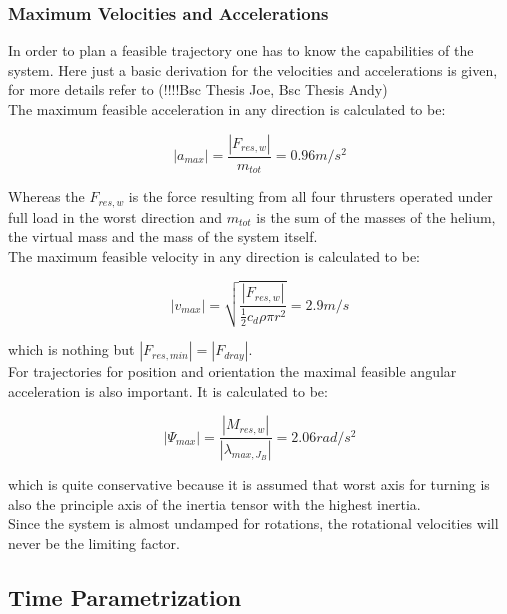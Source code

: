 \subsubsection{Maximum Velocities and Accelerations}
In order to plan a feasible trajectory one has to know the capabilities of the system. Here just a basic derivation for the velocities and accelerations is given, for more details refer to (!!!!Bsc Thesis Joe, Bsc Thesis Andy)\\

The maximum feasible acceleration in any direction is calculated to be:

\begin{equation}
  \left|a_{max} \right| =  \frac{\left|F_{res, w}\right|}{m_{tot}} = 0.96 m/s^2
\end{equation}

Whereas the $F_{res,w}$ is the force resulting from all four thrusters operated under full load in the worst direction and $m_{tot}$ is the sum of the masses of the helium, the virtual mass and the mass of the system itself.\\


The maximum feasible velocity in any direction is calculated to be:

\begin{equation}
\left|v_{max} \right| = \sqrt{\frac{\left|F_{res,w} \right|}{\frac{1}{2}c_d \rho \pi r^2}}=2.9 m/s
\end{equation}

which is nothing but $ \left|F_{res,min} \right| = \left|F_{dray} \right| $.\\

For trajectories for position and orientation the maximal feasible angular acceleration is also important. It is calculated to be:

\begin{equation}
  \left|\Psi_{max} \right| =  \frac{\left|M_{res,w}\right|}{\left| \lambda_{max, J_{B}} \right|} = 2.06 rad/s^2 
\end{equation}

which is quite conservative because it is assumed that worst axis for turning is also the principle axis of the inertia tensor with the highest inertia.\\

Since the system is almost undamped for rotations, the rotational velocities will never be the limiting factor.

\subsection{Time Parametrization}

